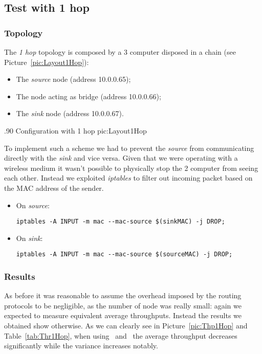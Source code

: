 \subsection{Test with 1 hop}
\subsubsection{Topology}
        The \emph{1 hop} topology is composed by a 3 computer disposed
        in a chain (see Picture~\ref{pic:Layout1Hop}):
        \begin{itemize}
        \item   The \emph{source} node (address 10.0.0.65);
        \item   The node acting as bridge (address 10.0.0.66);
        \item   The \emph{sink} node (address 10.0.0.67).
        \end{itemize}

                {.90\columnwidth}
                {Configuration with 1 hop}
                {pic:Layout1Hop}

        To implement such a scheme we had to prevent the \emph{source}
        from communicating directly with the \emph{sink} and vice versa. Given
        that we were operating with a wireless medium it wasn't possible
        to physically stop the 2 computer from seeing each
        other. Instead we exploited \emph{iptables} to filter out incoming
        packet based on the MAC address of the sender.

        \begin{itemize}
        \item On \emph{source}:
            \begin{verbatim}
iptables -A INPUT -m mac --mac-source $(sinkMAC) -j DROP;
            \end{verbatim}

        \item On \emph{sink}:
            \begin{verbatim}
iptables -A INPUT -m mac --mac-source $(sourceMAC) -j DROP;
            \end{verbatim}

        \end{itemize}

\subsubsection{Results}
      As before it was reasonable to assume the overhead imposed by
      the routing protocols to be negligible, as the number of node was
      really small: again we expected to measure equivalent average
      throughputs. Instead the results we obtained show otherwise.
      As we can clearly see in  Picture~\ref{pic:Thp1Hop} and
      Table~\ref{tab:Thr1Hop}, when using \batman\ and \olsr\, the average
      throughput decreases significantly while the variance increases notably.

